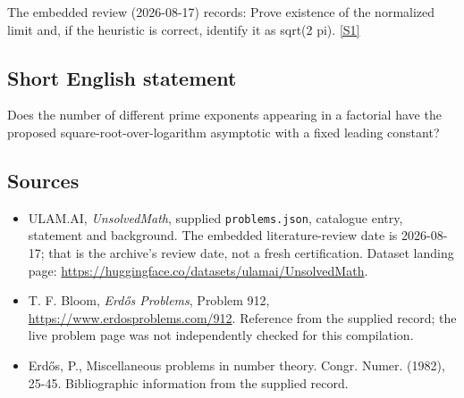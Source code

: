 \documentclass[11pt,a4paper]{article}
\newcommand{\sref}[2]{\hyperlink{source:#1:#2}{[S#2]}}
\begin{document}
The embedded review (2026-08-17) records: Prove existence of the normalized limit and, if the heuristic is correct, identify it as sqrt(2 pi). \sref{statement}{1}

\subsection{Short English statement}

Does the number of different prime exponents appearing in a factorial have the proposed square-root-over-logarithm asymptotic with a fixed leading constant?

\subsection{Sources}

{\small

\begin{itemize}

\item[\hypertarget{source:statement:1}{S1}] ULAM.AI, \emph{UnsolvedMath}, supplied \texttt{problems.json}, catalogue entry, statement and background. The embedded literature-review date is 2026-08-17; that is the archive’s review date, not a fresh certification. Dataset landing page: \url{https://huggingface.co/datasets/ulamai/UnsolvedMath}.

\item[\hypertarget{source:statement:2}{S2}] T. F. Bloom, \emph{Erdős Problems}, Problem 912, \url{https://www.erdosproblems.com/912}. Reference from the supplied record; the live problem page was not independently checked for this compilation.

\item[\hypertarget{source:statement:3}{S3}] Erd\H{o}s, P., Miscellaneous problems in number theory. Congr. Numer. (1982), 25-45. Bibliographic information from the supplied record.

\end{itemize}

}

\label{end:statement}
\end{document}
